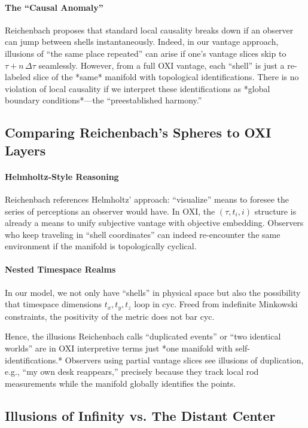 \documentclass{article}
\begin{document}
\paragraph{The “Causal Anomaly”} Reichenbach proposes that standard local causality breaks down if an observer can jump between shells instantaneously. Indeed, in our vantage approach, illusions of “the same place repeated” can arise if one’s vantage slices skip to $\tau + n\,\Delta\tau$ seamlessly. However, from a full OXI vantage, each “shell” is just a re-labeled slice of the *same* manifold with topological identifications. There is no violation of local causality if we interpret these identifications as *global boundary conditions*—the “preestablished harmony.”

\subsection{Comparing Reichenbach’s Spheres to OXI Layers}

\paragraph{Helmholtz-Style Reasoning} Reichenbach references Helmholtz’ approach: “visualize” means to foresee the series of perceptions an observer would have. In OXI, the $(\tau, t_i, i)$ structure is already a means to unify subjective vantage with objective embedding. Observers who keep traveling in “shell coordinates” can indeed re-encounter the same environment if the manifold is topologically cyclical.

\paragraph{Nested Timespace Realms} In our model, we not only have “shells” in physical space but also the possibility that timespace dimensions $t_x, t_y, t_z$ loop in cyc. Freed from indefinite Minkowski constraints, the positivity of the metric does not bar cyc.

Hence, the illusions Reichenbach calls “duplicated events” or “two identical worlds” are in OXI interpretive terms just *one manifold with self-identifications.* Observers using partial vantage slices see illusions of duplication, e.g., “my own desk reappears,” precisely because they track local rod measurements while the manifold globally identifies the points.

\subsection{Illusions of Infinity vs. The Distant Center}
\end{document}
